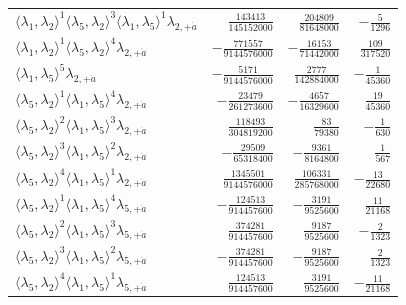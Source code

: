 \begin{longtable}{@{}lrrr@{}}
$\langle\lambda_1,\lambda_2\rangle^{1}\langle\lambda_5,\lambda_2\rangle^{3}\langle\lambda_1,\lambda_5\rangle^{1}\lambda_{2,+\dot a}$ & $\frac{143413}{145152000}$ & $\frac{204809}{81648000}$ & $-\frac{5}{1296}$ \\
$\langle\lambda_1,\lambda_2\rangle^{1}\langle\lambda_5,\lambda_2\rangle^{4}\lambda_{2,+\dot a}$ & $-\frac{771557}{9144576000}$ & $-\frac{16153}{71442000}$ & $\frac{109}{317520}$ \\
$\langle\lambda_1,\lambda_5\rangle^{5}\lambda_{2,+\dot a}$ & $-\frac{5171}{9144576000}$ & $\frac{2777}{142884000}$ & $-\frac{1}{45360}$ \\
$\langle\lambda_5,\lambda_2\rangle^{1}\langle\lambda_1,\lambda_5\rangle^{4}\lambda_{2,+\dot a}$ & $-\frac{23479}{261273600}$ & $-\frac{4657}{16329600}$ & $\frac{19}{45360}$ \\
$\langle\lambda_5,\lambda_2\rangle^{2}\langle\lambda_1,\lambda_5\rangle^{3}\lambda_{2,+\dot a}$ & $\frac{118493}{304819200}$ & $\frac{83}{79380}$ & $-\frac{1}{630}$ \\
$\langle\lambda_5,\lambda_2\rangle^{3}\langle\lambda_1,\lambda_5\rangle^{2}\lambda_{2,+\dot a}$ & $-\frac{29509}{65318400}$ & $-\frac{9361}{8164800}$ & $\frac{1}{567}$ \\
$\langle\lambda_5,\lambda_2\rangle^{4}\langle\lambda_1,\lambda_5\rangle^{1}\lambda_{2,+\dot a}$ & $\frac{1345501}{9144576000}$ & $\frac{106331}{285768000}$ & $-\frac{13}{22680}$ \\
$\langle\lambda_5,\lambda_2\rangle^{1}\langle\lambda_1,\lambda_5\rangle^{4}\lambda_{5,+\dot a}$ & $-\frac{124513}{914457600}$ & $-\frac{3191}{9525600}$ & $\frac{11}{21168}$ \\
$\langle\lambda_5,\lambda_2\rangle^{2}\langle\lambda_1,\lambda_5\rangle^{3}\lambda_{5,+\dot a}$ & $\frac{374281}{914457600}$ & $\frac{9187}{9525600}$ & $-\frac{2}{1323}$ \\
$\langle\lambda_5,\lambda_2\rangle^{3}\langle\lambda_1,\lambda_5\rangle^{2}\lambda_{5,+\dot a}$ & $-\frac{374281}{914457600}$ & $-\frac{9187}{9525600}$ & $\frac{2}{1323}$ \\
$\langle\lambda_5,\lambda_2\rangle^{4}\langle\lambda_1,\lambda_5\rangle^{1}\lambda_{5,+\dot a}$ & $\frac{124513}{914457600}$ & $\frac{3191}{9525600}$ & $-\frac{11}{21168}$ \\
\end{longtable}
